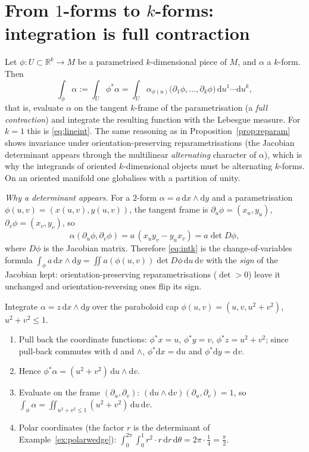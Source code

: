 \documentclass[11pt,a4paper]{article}
\numberwithin{equation}{section}
\theoremstyle{definition}
\theoremstyle{plain}
\newcommand{\R}{\mathbb{R}}
\newcommand{\dd}{\mathrm{d}}
\newcommand{\pb}{{}^{*}}                            %
\begin{document}
\section{From $1$-forms to $k$-forms: integration is full contraction}\label{sec:intk}

Let $\phi:U\subset\R^k\to M$ be a parametrised $k$-dimensional piece of $M$, and $\alpha$ a $k$-form. Then
\begin{equation}\label{eq:intk}
\int_\phi\alpha:=\int_U\phi\pb\alpha=\int_U\alpha_{\phi(u)}\bigl(\partial_1\phi,\dots,\partial_k\phi\bigr)\,\dd u^1\cdots\dd u^k,
\end{equation}
that is, evaluate $\alpha$ on the tangent $k$-frame of the parametrisation (a \emph{full contraction}) and integrate the resulting function with the Lebesgue measure. For $k=1$ this is \eqref{eq:lineint}.
The same reasoning as in Proposition~\ref{prop:reparam} shows invariance under orientation-preserving reparametrisations (the Jacobian determinant appears through the multilinear \emph{alternating} character of $\alpha$), which is why the integrands of oriented $k$-dimensional objects must be alternating $k$-forms. On an oriented manifold one globalises with a partition of unity.

\emph{Why a determinant appears.} For a $2$-form $\alpha=a\,\dd x\wedge\dd y$ and a parametrisation $\phi(u,v)=(x(u,v),y(u,v))$, the tangent frame is $\partial_u\phi=(x_u,y_u)$, $\partial_v\phi=(x_v,y_v)$, so
\[
\alpha(\partial_u\phi,\partial_v\phi)=a\,(x_uy_v-y_ux_v)=a\det D\phi,
\]
where $D\phi$ is the Jacobian matrix. Therefore \eqref{eq:intk} is the change-of-variables formula $\int_\phi a\,\dd x\wedge\dd y=\iint a(\phi(u,v))\det D\phi\,\dd u\,\dd v$ with the \emph{sign} of the Jacobian kept: orientation-preserving reparametrisations ($\det>0$) leave it unchanged and orientation-reversing ones flip its sign.

\begin{example}\label{ex:paraboloid}
Integrate $\alpha=z\,\dd x\wedge\dd y$ over the paraboloid cap $\phi(u,v)=(u,v,u^2+v^2)$, $u^2+v^2\le1$.
\begin{enumerate}
\item Pull back the coordinate functions: $\phi\pb x=u$, $\phi\pb y=v$, $\phi\pb z=u^2+v^2$; since pull-back commutes with $\dd$ and $\wedge$, $\phi\pb\dd x=\dd u$ and $\phi\pb\dd y=\dd v$.
\item Hence $\phi\pb\alpha=(u^2+v^2)\,\dd u\wedge\dd v$.
\item Evaluate on the frame $(\partial_u,\partial_v)$: $(\dd u\wedge\dd v)(\partial_u,\partial_v)=1$, so $\int_\phi\alpha=\iint_{u^2+v^2\le1}(u^2+v^2)\,\dd u\,\dd v$.
\item Polar coordinates (the factor $r$ is the determinant of Example~\ref{ex:polarwedge}): $\displaystyle\int_0^{2\pi}\!\!\int_0^1r^2\cdot r\,\dd r\,\dd\theta=2\pi\cdot\tfrac14=\tfrac\pi2$.
\end{enumerate}
\end{example}
\end{document}
